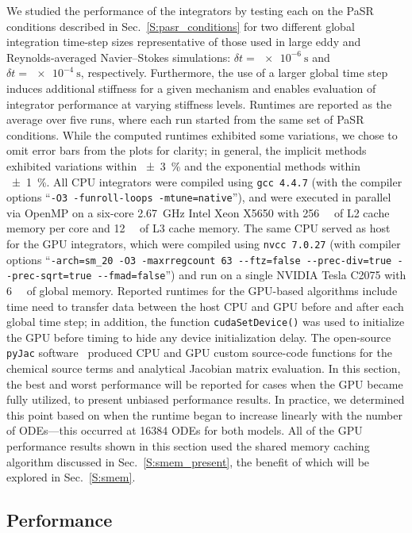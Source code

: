 \documentclass[final,twocolumn]{elsarticle}
\begin{document}
We studied the performance of the integrators by testing each on the PaSR conditions described in Sec.~\ref{S:pasr_conditions} for two different global integration time-step sizes representative of those used in large eddy and Reynolds-averaged Navier--Stokes simulations: $\delta t = \SI{e-6}{\s}$ and $\delta t = \SI{e-4}{\s}$, respectively.
Furthermore, the use of a larger global time step induces additional stiffness for a given mechanism and enables evaluation of integrator performance at varying stiffness levels.
Runtimes are reported as the average over five runs, where each run started from the same set of PaSR conditions.
While the computed runtimes exhibited some variations, we chose to omit error bars from the plots for clarity; in general, the implicit methods exhibited variations within \SI{\pm3}{\percent} and the exponential methods within \SI{\pm1}{\percent}.
All CPU integrators were compiled using \texttt{gcc 4.4.7} (with the compiler options ``\texttt{-O3 -funroll-loops -mtune=native}''), and were executed in parallel via OpenMP on a six-core \SI{2.67}{\giga\hertz} Intel Xeon X5650 with \SI{256}{\kilo\byte} of L2 cache memory per core and \SI{12}{\mega\byte} of L3 cache memory.
The same CPU served as host for the GPU integrators, which were compiled using \texttt{nvcc 7.0.27} (with compiler options ``\texttt{-arch=sm\_20 -O3 -maxrregcount 63 -{}-ftz=false -{}-prec-div=true -{}-prec-sqrt=true -{}-fmad=false}'') and run on a single NVIDIA Tesla C2075 with \SI{6}{\giga\byte} of global memory.
Reported runtimes for the GPU-based algorithms include time need to transfer data between the host CPU and GPU before and after each global time step; in addition, the function \texttt{cudaSetDevice()} was used to initialize the GPU before timing to hide any device initialization delay.
The open-source \texttt{pyJac} software~\cite{Niemeyer:2015im,Niemeyer:2015ws} produced CPU and GPU custom source-code functions for the chemical source terms and analytical Jacobian matrix evaluation.
In this section, the best and worst performance will be reported for cases when the GPU became fully utilized, to present unbiased performance results.
In practice, we determined this point based on when the runtime began to increase linearly with the number of ODEs---this occurred at \num{16384} ODEs for both models.
All of the GPU performance results shown in this section used the shared memory caching algorithm discussed in Sec.~\ref{S:smem_present}, the benefit of which will be explored in Sec.~\ref{S:smem}.

\subsection{Performance}
\ifmeasure
\addvspace{10pt}
\fi
\end{document}
